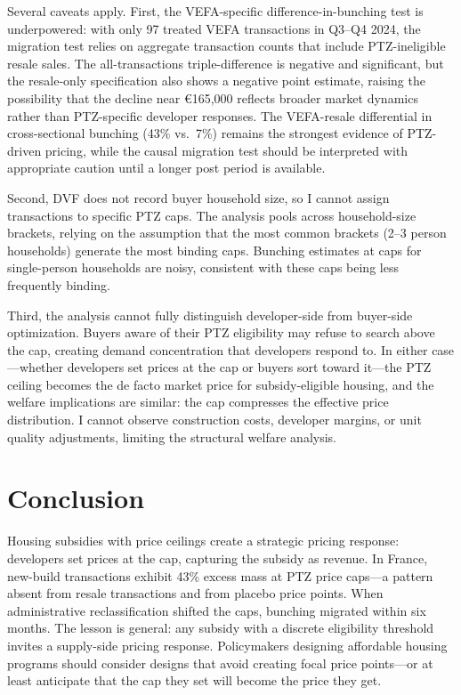 \documentclass[12pt]{article}
\begin{document}
Several caveats apply. First, the VEFA-specific difference-in-bunching test is underpowered: with only 97 treated VEFA transactions in Q3--Q4 2024, the migration test relies on aggregate transaction counts that include PTZ-ineligible resale sales. The all-transactions triple-difference is negative and significant, but the resale-only specification also shows a negative point estimate, raising the possibility that the decline near \euro165,000 reflects broader market dynamics rather than PTZ-specific developer responses. The VEFA-resale differential in cross-sectional bunching (43\% vs.\ 7\%) remains the strongest evidence of PTZ-driven pricing, while the causal migration test should be interpreted with appropriate caution until a longer post period is available.

Second, DVF does not record buyer household size, so I cannot assign transactions to specific PTZ caps. The analysis pools across household-size brackets, relying on the assumption that the most common brackets (2--3 person households) generate the most binding caps. Bunching estimates at caps for single-person households are noisy, consistent with these caps being less frequently binding.

Third, the analysis cannot fully distinguish developer-side from buyer-side optimization. Buyers aware of their PTZ eligibility may refuse to search above the cap, creating demand concentration that developers respond to. In either case---whether developers set prices at the cap or buyers sort toward it---the PTZ ceiling becomes the de facto market price for subsidy-eligible housing, and the welfare implications are similar: the cap compresses the effective price distribution. I cannot observe construction costs, developer margins, or unit quality adjustments, limiting the structural welfare analysis.

\section{Conclusion}

Housing subsidies with price ceilings create a strategic pricing response: developers set prices at the cap, capturing the subsidy as revenue. In France, new-build transactions exhibit 43\% excess mass at PTZ price caps---a pattern absent from resale transactions and from placebo price points. When administrative reclassification shifted the caps, bunching migrated within six months. The lesson is general: any subsidy with a discrete eligibility threshold invites a supply-side pricing response. Policymakers designing affordable housing programs should consider designs that avoid creating focal price points---or at least anticipate that the cap they set will become the price they get.
\end{document}
